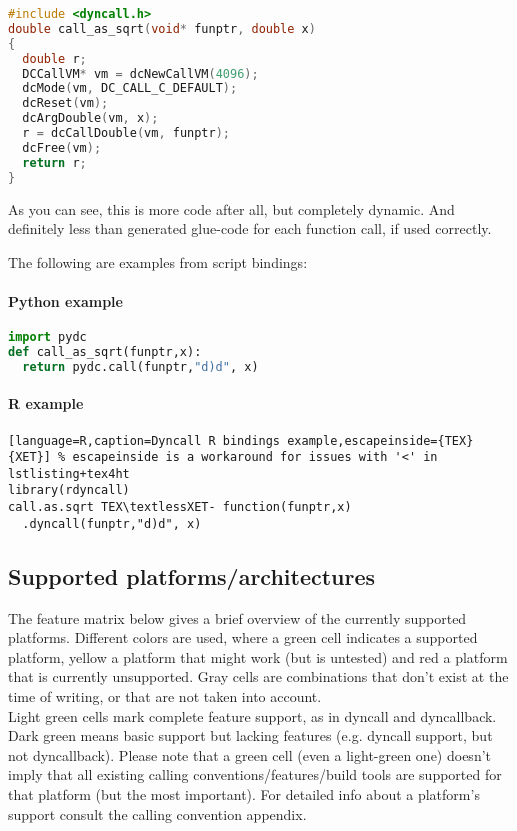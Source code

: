 \begin{lstlisting}[language=c,caption=Dyncall C library example]
#include <dyncall.h>
double call_as_sqrt(void* funptr, double x)
{
  double r;
  DCCallVM* vm = dcNewCallVM(4096);
  dcMode(vm, DC_CALL_C_DEFAULT);
  dcReset(vm);
  dcArgDouble(vm, x);  
  r = dcCallDouble(vm, funptr);
  dcFree(vm);
  return r;
}
\end{lstlisting}

As you can see, this is more code after all, but completely dynamic.
And definitely less than generated glue-code for each function call, if
used correctly.

The following are examples from script bindings:

\paragraph{Python example}

\begin{lstlisting}[language=python,caption=Dyncall Python bindings example]
import pydc
def call_as_sqrt(funptr,x):
  return pydc.call(funptr,"d)d", x)
\end{lstlisting}


\paragraph{R example}

\begin{lstlisting}[language=R,caption=Dyncall R bindings example,escapeinside={TEX}{XET}] % escapeinside is a workaround for issues with '<' in lstlisting+tex4ht
library(rdyncall)
call.as.sqrt TEX\textlessXET- function(funptr,x)
  .dyncall(funptr,"d)d", x)
\end{lstlisting}


\pagebreak

\subsection{Supported platforms/architectures}

The feature matrix below gives a brief overview of the currently supported
platforms. Different colors are used, where a green cell indicates a supported
platform, yellow a platform that might work (but is untested) and red a platform
that is currently unsupported. Gray cells are combinations that don't exist
at the time of writing, or that are not taken into account.\\
Light green cells mark complete feature support, as in dyncall and dyncallback. Dark green means basic support but lacking features (e.g. dyncall support, but not dyncallback).
Please note that a green cell (even a light-green one) doesn't imply that all existing calling conventions/features/build tools are supported for that platform (but the most
important).
For detailed info about a platform's support consult the calling convention appendix.

